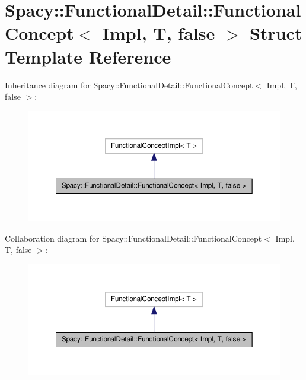 \hypertarget{structSpacy_1_1FunctionalDetail_1_1FunctionalConcept_3_01Impl_00_01T_00_01false_01_4}{\section{\-Spacy\-:\-:\-Functional\-Detail\-:\-:\-Functional\-Concept$<$ \-Impl, \-T, false $>$ \-Struct \-Template \-Reference}
\label{structSpacy_1_1FunctionalDetail_1_1FunctionalConcept_3_01Impl_00_01T_00_01false_01_4}
}


\-Inheritance diagram for \-Spacy\-:\-:\-Functional\-Detail\-:\-:\-Functional\-Concept$<$ \-Impl, \-T, false $>$\-:
\nopagebreak
\begin{figure}[H]
\begin{center}
\leavevmode
\includegraphics[width=350pt]{structSpacy_1_1FunctionalDetail_1_1FunctionalConcept_3_01Impl_00_01T_00_01false_01_4__inherit__graph}
\end{center}
\end{figure}


\-Collaboration diagram for \-Spacy\-:\-:\-Functional\-Detail\-:\-:\-Functional\-Concept$<$ \-Impl, \-T, false $>$\-:
\nopagebreak
\begin{figure}[H]
\begin{center}
\leavevmode
\includegraphics[width=350pt]{structSpacy_1_1FunctionalDetail_1_1FunctionalConcept_3_01Impl_00_01T_00_01false_01_4__coll__graph}
\end{center}
\end{figure}
